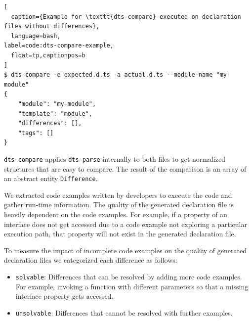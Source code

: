 \documentclass[english,cleveref,autoref,submission]{programming}
\begin{document}
\begin{lstlisting}[
  caption={Example for \texttt{dts-compare} executed on declaration files without differences},
  language=bash,
label=code:dts-compare-example,
  float=tp,captionpos=b
]
$ dts-compare -e expected.d.ts -a actual.d.ts --module-name "my-module"
{
    "module": "my-module",
    "template": "module",
    "differences": [],
    "tags": []
}
\end{lstlisting}

\texttt{dts-compare} applies \texttt{dts-parse} internally to both files to get 
normalized structures that are easy to compare. The result of the comparison is an array
of an abstract entity \texttt{Difference}.

We extracted code examples written by
developers to execute the code and gather run-time information. The quality of the
generated declaration file is heavily dependent on the code examples. For example, if a
property of an interface does not get accessed due to a code example not exploring a
particular execution path, that property will not exist in the generated declaration
file. 

To measure the impact of incomplete code examples on the
quality of generated declaration files we categorized each difference as follows: 
\begin{itemize}
  \item \texttt{solvable}: Differences that can be resolved by adding more code
    examples. For example, invoking a function with different parameters so that a missing
    interface property gets accessed. 
  \item \texttt{unsolvable}: Differences that cannot be resolved with further examples.
\end{itemize}
\end{document}

